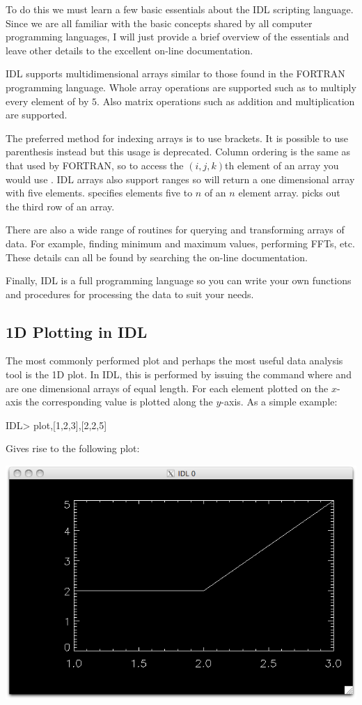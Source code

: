   To do this we must learn a few basic essentials about the IDL scripting
  language. Since we are all familiar with the basic concepts shared by
  all computer programming languages, I will just provide a brief overview
  of the essentials and leave other details to the excellent on-line
  documentation.

  IDL supports multidimensional arrays similar to those found in the
  FORTRAN programming language. Whole array operations are supported
  such as  to multiply every element of  by $5$.
  Also matrix operations such as addition and multiplication are supported.

  The preferred method for indexing arrays is to use brackets. It is
  possible to use parenthesis instead but this usage is deprecated.
  Column ordering is the same as that used by FORTRAN, so to access
  the $(i,j,k)$th element of an array you would use .
  IDL arrays also support ranges so  will return
  a one dimensional array with five elements.  specifies
  elements five to $n$ of an $n$ element array.  picks
  out the third row of an array.

  There are also a wide range of routines for querying and transforming
  arrays of data. For example, finding minimum and maximum values,
  performing FFTs, etc. These details can all be found by searching the
  on-line documentation. 

  Finally, IDL is a full programming language so you can write your own
  functions and procedures for processing the data to suit your needs.

\subsection{1D Plotting in IDL}
  The most commonly performed plot and perhaps the most useful data analysis
  tool is the 1D plot. In IDL, this is performed by issuing the command
   where  and  are one dimensional arrays of
  equal length. For each element  plotted on the $x$-axis the
  corresponding value  is plotted along the $y$-axis. As a
  simple example:
\begin{boxverbatim}
IDL> plot,[1,2,3],[2,2,5]
\end{boxverbatim}
  Gives rise to the following plot:
  \begin{center}
    \includegraphics[width=0.7\linewidth]{images/idl_simple_plot}
  \end{center}

